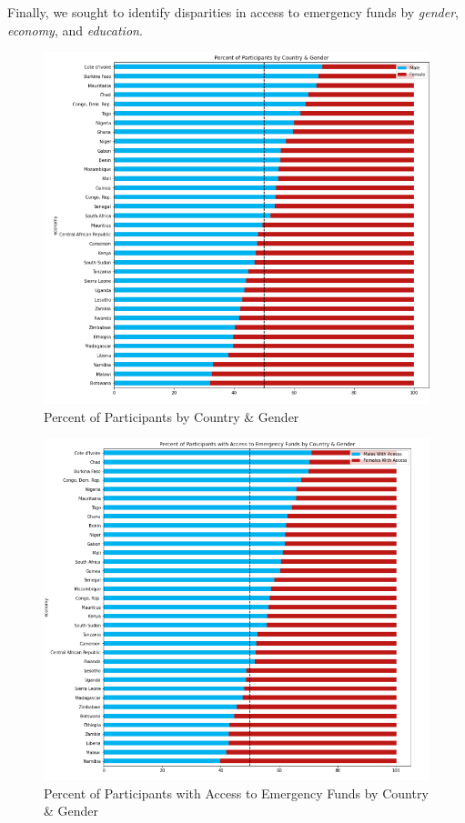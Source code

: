 \documentclass[water,article,submit,moreauthors,pdftex]{mdpi}
\begin{document}
Finally, we sought to identify disparities in access to emergency funds
by \emph{gender}, \emph{economy}, and \emph{education}.

\begin{figure}
\centering
\includegraphics[width=\textwidth,height=0.5\textheight]{images/percent_participants_by_country_gender.png}
\caption{Percent of Participants by Country \& Gender}
\end{figure}

\begin{figure}
\centering
\includegraphics[width=\textwidth,height=0.5\textheight]{images/percent_access_funds_by_country_gender.png}
\caption{Percent of Participants with Access to Emergency Funds by
Country \& Gender}
\end{figure}
\end{document}
